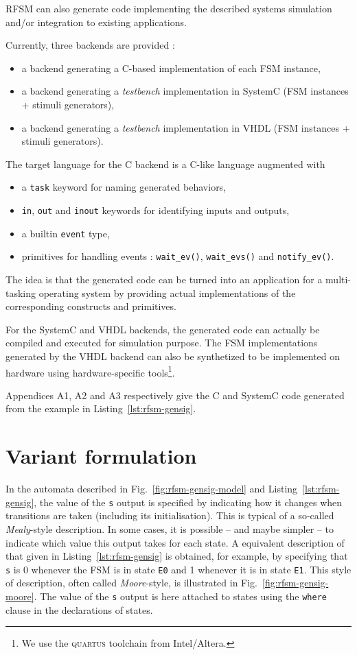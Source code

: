 RFSM can also generate code implementing the described systems simulation and/or
integration to existing applications.

\medskip
Currently, three backends are provided :
\begin{itemize}
\item a backend generating a C-based implementation of each FSM instance,
\item a backend generating a \emph{testbench} implementation in SystemC (FSM instances + stimuli
  generators),
\item a backend generating a \emph{testbench} implementation in VHDL (FSM instances + stimuli
  generators).
\end{itemize}

\medskip
The target language for the C backend is a C-like language augmented with
\begin{itemize}
\item a \verb|task| keyword for naming generated behaviors,
\item \verb|in|, \verb|out| and \verb|inout| keywords for identifying inputs and outputs,
\item a builtin \verb|event| type,
\item primitives for handling events : \verb|wait_ev()|, \verb|wait_evs()| and
  \verb|notify_ev()|. 
\end{itemize}
The idea is that the generated code can be turned into an application for a multi-tasking operating
system by providing actual implementations of the corresponding constructs and primitives.

\medskip
For the SystemC and VHDL backends, the generated code can actually be compiled and executed for
simulation purpose. The FSM implementations generated by the VHDL backend can also be
synthetized to be implemented on hardware using hardware-specific tools\footnote{We use the
  \textsc{quartus} toolchain from Intel/Altera.}. 

\medskip
Appendices A1, A2 and A3 respectively give the C and SystemC code generated from the example in
Listing~\ref{lst:rfsm-gensig}. 

\section*{Variant formulation}
\label{sec:variant-formulation}

In the automata described in Fig.~\ref{fig:rfsm-gensig-model} and Listing~\ref{lst:rfsm-gensig}, the
value of the \texttt{s} output is specified by indicating how it changes when transitions are taken
(including its initialisation). This is typical of a so-called \emph{Mealy}-style description.  In
some cases, it is possible -- and maybe simpler -- to indicate which value this output takes for
each state. A equivalent description of that given
in Listing~\ref{lst:rfsm-gensig} is obtained, for example, by specifying that \texttt{s} is 0
whenever the FSM is in state \texttt{E0} and 1 whenever it is in state \texttt{E1}.
This style of description, often called
\emph{Moore}-style, is illustrated in Fig.~\ref{fig:rfsm-gensig-moore}. The value of the \texttt{s}
output is here attached to states using the \texttt{where} clause in the declarations of states.

